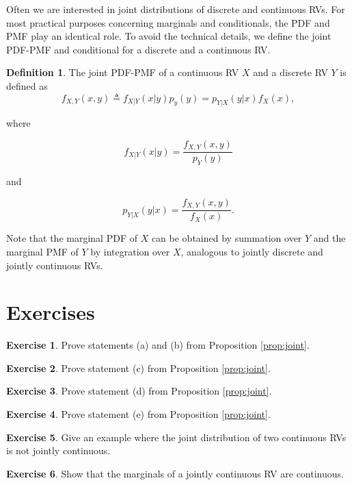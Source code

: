 \documentclass{book}
\theoremstyle{plain}%
\theoremstyle{definition}
\newtheorem{definition}{Definition}[section]
\newtheorem{exercise}{Exercise}[chapter]
\begin{document}
Often we are interested in joint distributions of discrete and continuous RVs. For most practical purposes concerning marginals and conditionals, the PDF and PMF play an identical role. To avoid the technical details, we define the joint PDF-PMF and conditional for a discrete and a continuous RV.

\begin{definition}
The joint PDF-PMF of a continuous RV $X$ and a discrete RV $Y$ is defined as
$$f_{X,Y}(x,y) \triangleq f_{X|Y}(x|y)p_y(y) = p_{Y|X}(y|x)f_X(x),$$

where 

$$f_{X|Y}(x|y) = \frac{f_{X,Y}(x, y)}{p_Y(y)}$$

and

$$p_{Y|X}(y|x) = \frac{f_{X,Y}(x, y)}{f_X(x)}.$$

\end{definition}

Note that the marginal PDF of $X$ can be obtained by summation over $Y$ and the marginal PMF of $Y$ by integration over $X$, analogous to jointly discrete and jointly continuous RVs.
\section*{Exercises}

\begin{exercise}
Prove statements (a) and (b) from Proposition \ref{prop:joint}.
\end{exercise}

\begin{exercise}
Prove statement (c) from Proposition \ref{prop:joint}.
\end{exercise}

\begin{exercise}
Prove statement (d) from Proposition \ref{prop:joint}.
\end{exercise}

\begin{exercise}
Prove statement (e) from Proposition \ref{prop:joint}.
\end{exercise}

\begin{exercise}
Give an example where the joint distribution of two continuous RVs is not jointly continuous.
\end{exercise}

\begin{exercise}
Show that the marginals of a jointly continuous RV are continuous.
\end{exercise}
\end{document}
